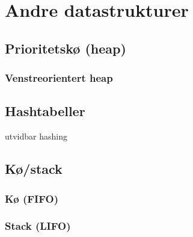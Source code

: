 \section{\color{red}Andre datastrukturer}
\subsection{\color{red}Prioritetskø (heap)}
\subsubsection{\color{red}Venstreorientert heap}
\subsection{\color{red}Hashtabeller}
utvidbar hashing

\subsection{\color{red}Kø/stack}
\subsubsection{\color{red}Kø (FIFO)}
\subsubsection{\color{red}Stack (LIFO)}